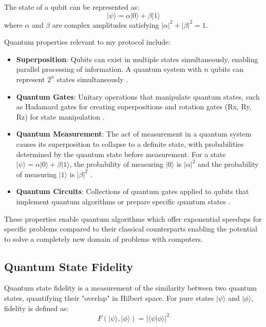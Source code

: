 \documentclass[11pt,a4paper]{article}
\begin{document}
The state of a \gls{qubit} can be represented as:
\begin{equation}
|\psi\rangle = \alpha|0\rangle + \beta|1\rangle
\end{equation}
where $\alpha$ and $\beta$ are complex amplitudes satisfying $|\alpha|^2 + |\beta|^2 = 1$.

Quantum properties relevant to my protocol include:

\begin{itemize}
    \item \textbf{Superposition}: Qubits can exist in multiple states simultaneously, enabling parallel processing of information. A quantum system with $n$ qubits can represent $2^n$ states simultaneously \cite{ibm_quantum}.
    \item \textbf{Quantum Gates}: Unitary operations that manipulate quantum states, such as Hadamard gates for creating superpositions and rotation gates (Rx, Ry, Rz) for state manipulation \cite{ibm_quantum}.
    \item \textbf{Quantum Measurement}: The act of measurement in a quantum system causes its superposition to collapse to a definite state, with probabilities determined by the quantum state before measurement. For a state $|\psi\rangle = \alpha|0\rangle + \beta|1\rangle$, the probability of measuring $|0\rangle$ is $|\alpha|^2$ and the probability of measuring $|1\rangle$ is $|\beta|^2$ \cite{ibm_quantum}.
    \item \textbf{Quantum Circuits}: Collections of quantum gates applied to qubits that implement quantum algorithms or prepare specific quantum states \cite{ibm_quantum}.
\end{itemize}

These properties enable quantum algorithms which offer exponential speedups for specific problems compared to their classical counterparts enabling the potential to solve a completely new domain of problems with computers.

\subsection{Quantum State Fidelity}
Quantum state fidelity is a measurement of the similarity between two quantum states, quantifying their "overlap" in Hilbert space. For pure states $|\psi\rangle$ and $|\phi\rangle$, fidelity is defined as:
\begin{equation}
F(|\psi\rangle, |\phi\rangle) = |\langle\psi|\phi\rangle|^2
\end{equation}
\end{document}
